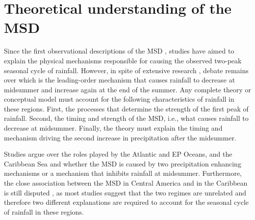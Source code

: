 
\section{Theoretical understanding of the MSD}\label{sq:lit}



Since the first observational descriptions of the MSD \citep[e.g.][]{mosino1966}, studies have aimed to explain the physical mechanisms responsible for causing the observed two-peak seasonal cycle of rainfall. However, 
in spite of extensive research \citep[e.g.][]{magana1999,giannini2000,gamble2008,ryu2014,herrera2015,maldonado2017,straffon2019}, debate remains over which is the leading-order mechanism that causes rainfall to decrease at midsummer and increase again at the end of the summer. Any complete theory or conceptual model must account for the following characteristics of rainfall in these regions. First, the processes that determine the strength of the first peak of rainfall. Second, the timing and strength of the MSD, i.e., what causes rainfall to decrease at midsummer. Finally, the theory must explain the timing and mechanism driving the second increase in precipitation after the midsummer. %

Studies argue over the roles played by the Atlantic and EP Oceans, and the Caribbean Sea and whether the MSD is caused by two precipitation enhancing mechanisms \citep{karnauskas2013} or a mechanism that inhibits rainfall at midsummer. Furthermore, the close association between the MSD in Central America and in the Caribbean is still disputed \citep{gamble2008}, as most studies suggest that the two regimes are unrelated and therefore two different explanations are required to account for the seasonal cycle of rainfall in these regions. 

